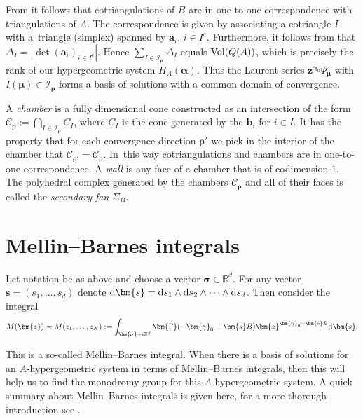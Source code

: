 From \cite[Section 5.4]{DRS10} it follows that cotriangulations of $B$ are
in one-to-one correspondence with triangulations of $A$. The correspondence is given
by associating a cotriangle $I$ with a~triangle (simplex) spanned by $\bm{a}_i$, $i\in I^c$.
Furthermore, it follows from \cite[Lemma 14.2]{Beu11} that $\Delta_I=|\det(\bm{a}_i)_{i\in I^c}|$.
Hence $\sum_{I\in\mathcal{I}_{\bm\rho}}\Delta_I$ equals ${\rm Vol}(Q(A))$, which is
precisely the rank of our hypergeometric system $H_A(\bm\alpha)$. Thus the Laurent
series $\bm{z}^{\bm\gamma_0}\Psi_{\bm\mu}$ with $I(\bm\mu)\in\mathcal{I}_{\bm\rho}$
forms a basis of solutions with a common domain of convergence.

\begin{Definition}
\label{def-chamber-wall-fan}
A {\it chamber} is a fully dimensional cone constructed as an intersection of the form $\mathcal{C}_{\bm\rho} := \bigcap_{I \in \mathcal{I}_{\bm\rho}} C_I$, where $C_I$ is the cone generated by the $\bm{b}_i$ for $i \in I$. It has the property that for each convergence direction $\bm\rho'$ we pick in the interior of the chamber that $\mathcal{C}_{\bm\rho'} = \mathcal{C}_{\bm\rho}$. In~this way cotriangulations and chambers are in one-to-one correspondence. A {\it wall} is any face of a chamber that is of codimension $1$. The polyhedral complex generated by the chambers $\mathcal{C}_{\bm\rho}$ and all of their faces is called the {\it secondary fan} $\Sigma_B$.
\end{Definition}

\section{Mellin--Barnes integrals}

Let notation be as above and choose a vector $\bm{\sigma} \in \mathbb{R}^d$. For any vector $\bm{s} = (s_1,\dots,s_d)$ denote ${\rm d} \bm{s}= {\rm d} s_1 \wedge {\rm d} s_2 \wedge \dots \wedge {\rm d} s_d$. Then consider the integral
\begin{gather*}
M(\bm{z}) = M(z_1,\dots,z_N) := \int_{\bm{\sigma} + i\mathbb{R}^d} \bm{\Gamma}(-\bm{\gamma}_0-\bm{s}B)\bm{z}^{\bm{\gamma}_0 + \bm{s}B} {\rm d} \bm{s}.
\end{gather*}

This is a so-called Mellin--Barnes integral. When there is a basis of solutions
for an $A$-hypergeometric system in terms of Mellin--Barnes integrals, then this will help us to find the monodromy group for this $A$-hypergeometric system. A quick summary about Mellin--Barnes integrals is given here, for a more thorough introduction see \cite{Beu13}.


